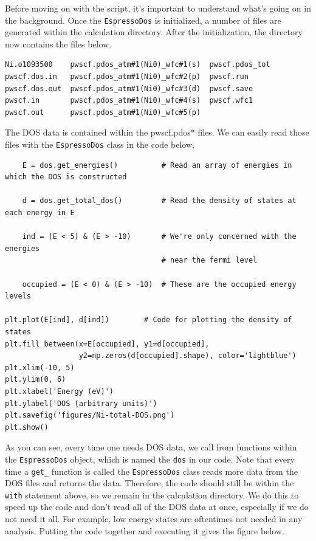 \documentclass[colorlinks=true,urlcolor=blue,linkcolor=blue,citecolor=red]{article}
\begin{document}
Before moving on with the script, it's important to understand what's going on in the background. Once the \texttt{EspressoDos} is initialized, a number of files are generated within the calculation directory. After the initialization, the directory now contains the files below.

\begin{verbatim}
Ni.o1093500    pwscf.pdos_atm#1(Ni0)_wfc#1(s)  pwscf.pdos_tot
pwscf.dos.in   pwscf.pdos_atm#1(Ni0)_wfc#2(p)  pwscf.run
pwscf.dos.out  pwscf.pdos_atm#1(Ni0)_wfc#3(d)  pwscf.save
pwscf.in       pwscf.pdos_atm#1(Ni0)_wfc#4(s)  pwscf.wfc1
pwscf.out      pwscf.pdos_atm#1(Ni0)_wfc#5(p)
\end{verbatim}

The DOS data is contained within the pwscf.pdos* files. We can easily read those files with the \texttt{EspressoDos} class in the code below.

\begin{verbatim}
    E = dos.get_energies()          # Read an array of energies in which the DOS is constructed

    d = dos.get_total_dos()         # Read the density of states at each energy in E

    ind = (E < 5) & (E > -10)       # We're only concerned with the energies
                                    # near the fermi level

    occupied = (E < 0) & (E > -10)  # These are the occupied energy levels

plt.plot(E[ind], d[ind])        # Code for plotting the density of states
plt.fill_between(x=E[occupied], y1=d[occupied],
                 y2=np.zeros(d[occupied].shape), color='lightblue')                    
plt.xlim(-10, 5)
plt.ylim(0, 6)
plt.xlabel('Energy (eV)')
plt.ylabel('DOS (arbitrary units)')
plt.savefig('figures/Ni-total-DOS.png')
plt.show()
\end{verbatim}

As you can see, every time one needs DOS data, we call from functions within the \texttt{EspressoDos} object, which is named the \texttt{dos} in our code. Note that every time a \texttt{get\_} function is called the \texttt{EspressoDos} class reads more data from the DOS files and returns the data. Therefore, the code should still be within the \texttt{with} statement above, so we remain in the calculation directory. We do this to speed up the code and don't read all of the DOS data at once, especially if we do not need it all. For example, low energy states are oftentimes not needed in any analysis. Putting the code together and executing it gives the figure below.
\end{document}
